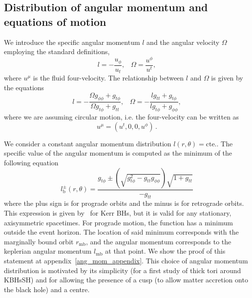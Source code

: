 \documentclass[twocolumn,aps,showpacs,showkeys,prd,superscriptaddress,byrevtex, amsmath]{revtex4-1}
\begin{document}
\subsection{Distribution of angular momentum and equations of motion}
We introduce the specific angular momentum $l$ and the angular velocity $\Omega$ employing the standard definitions,
\begin{equation}
l = - \frac{u_{\phi}}{u_t}, \;\;\; \Omega = \frac{u^{\phi}}{u^t},
\end{equation}
where $u^{\mu}$ is the fluid four-velocity.
The relationship between $l$ and $\Omega$ is given by the equations
\begin{equation}
l = - \frac{\Omega g_{\phi\phi} + g_{t\phi}}{\Omega g_{t\phi} + g_{tt}}, \;\;\; \Omega = - \frac{l g_{tt} + g_{t\phi}}{l g_{t\phi} + g_{\phi\phi}},
\end{equation}
where we are assuming circular motion, i.e. the four-velocity can be written as
\begin{equation}
u^{\mu} = (u^t, 0, 0, u^{\phi})\,.
\end{equation}

We consider a constant angular momentum distribution $l(r,\theta) = \mathrm{cte}.$. The specific value of the angular momentum is computed as the minimum of the following equation
\begin{equation}\label{eq:mb_ang_mom}
l^{\pm}_{\mathrm{b}}(r, \theta) = \frac{g_{t\phi}\pm\left(\sqrt{g_{t\phi}^2-g_{tt}g_{\phi\phi}}\right)\sqrt{1+g_{tt}}}{-g_{tt}}
\end{equation}
where the plus sign is for prograde orbits and the minus is for retrograde orbits.
This expression is given by~\citep{Daigne:2004} for Kerr BHs, but it is valid for any stationary, axisymmetric spacetimes. For prograde motion, the function has a minimum outside the event horizon. The location of said minimum corresponds with the marginally bound orbit $r_{\mathrm{mb}}$, and the angular momentum corresponds to the keplerian angular momentum $l_{\mathrm{mb}}$ at that point. We show the proof of this statement at appendix~\ref{ang_mom_appendix}. This choice of angular momentum distribution is motivated by its simplicity (for a first study of thick tori around KBHsSH) and for allowing the presence of a cusp (to allow matter accretion onto the black hole) and a centre.
\end{document}
